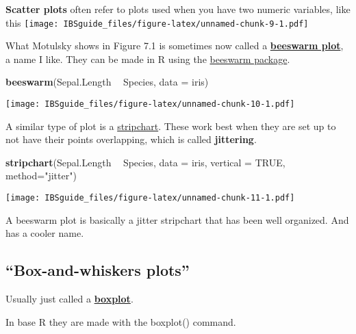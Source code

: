\documentclass[]{book}
\newenvironment{Shaded}{\begin{snugshade}}{\end{snugshade}}
\newcommand{\KeywordTok}[1]{\textcolor[rgb]{0.13,0.29,0.53}{\textbf{#1}}}
\newcommand{\DataTypeTok}[1]{\textcolor[rgb]{0.13,0.29,0.53}{#1}}
\newcommand{\StringTok}[1]{\textcolor[rgb]{0.31,0.60,0.02}{#1}}
\newcommand{\OtherTok}[1]{\textcolor[rgb]{0.56,0.35,0.01}{#1}}
\newcommand{\OperatorTok}[1]{\textcolor[rgb]{0.81,0.36,0.00}{\textbf{#1}}}
\newcommand{\NormalTok}[1]{#1}
\theoremstyle{definition}
\theoremstyle{definition}
\theoremstyle{definition}
\theoremstyle{remark}
\begin{document}
\textbf{Scatter plots} often refer to plots used when you have two
numeric variables, like this
\texttt{[image: IBSguide\_files/figure-latex/unnamed-chunk-9-1.pdf]}

What Motulsky shows in Figure 7.1 is sometimes now called a
\href{https://flowingdata.com/2016/09/08/beeswarm-plot-in-r-to-show-distributions/}{\textbf{beeswarm
plot}}, a name I like. They can be made in R using the
\href{http://www.cbs.dtu.dk/~eklund/beeswarm/}{beeswarm package}.

\begin{Shaded}
\begin{Highlighting}[]
\KeywordTok{beeswarm}\NormalTok{(Sepal.Length }\OperatorTok{~}\StringTok{ }\NormalTok{Species, }
         \DataTypeTok{data =}\NormalTok{ iris)}
\end{Highlighting}
\end{Shaded}

\texttt{[image: IBSguide\_files/figure-latex/unnamed-chunk-10-1.pdf]}

A similar type of plot is a
\href{http://www.clayford.net/statistics/tag/strip-charts/}{stripchart}.
These work best when they are set up to not have their points
overlapping, which is called \textbf{jittering}.

\begin{Shaded}
\begin{Highlighting}[]
\KeywordTok{stripchart}\NormalTok{(Sepal.Length }\OperatorTok{~}\StringTok{ }\NormalTok{Species, }
           \DataTypeTok{data =}\NormalTok{ iris, }
           \DataTypeTok{vertical =} \OtherTok{TRUE}\NormalTok{, }
           \DataTypeTok{method=}\StringTok{"jitter"}\NormalTok{)}
\end{Highlighting}
\end{Shaded}

\texttt{[image: IBSguide\_files/figure-latex/unnamed-chunk-11-1.pdf]}

A beeswarm plot is basically a jitter stripchart that has been well
organized. And has a cooler name.

\subsection{\texorpdfstring{``Box-and-whiskers
plots''}{Box-and-whiskers plots}}\label{box-and-whiskers-plots}

Usually just called a
\href{https://en.wikipedia.org/wiki/Box_plot}{\textbf{boxplot}}.

In base R they are made with the boxplot() command.
\end{document}
